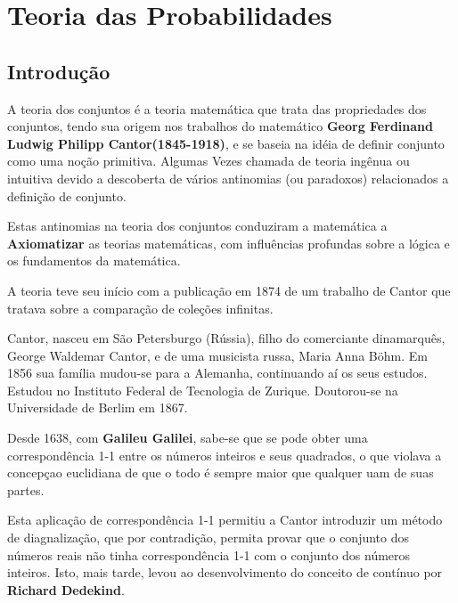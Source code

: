 \chapter{Teoria das Probabilidades}
\section{Introdução}

\inic A teoria dos conjuntos é a teoria matemática que trata das propriedades dos conjuntos, tendo sua origem nos trabalhos do matemático \textbf{Georg Ferdinand Ludwig Philipp Cantor(1845-1918)}, e se baseia na idéia de definir conjunto como uma noção primitiva. Algumas Vezes chamada de teoria ingênua ou intuitiva devido a descoberta de vários antinomias (ou paradoxos) relacionados a definição de conjunto.\vskip0.3cm

\inic Estas antinomias na teoria dos conjuntos conduziram a matemática a \textbf{Axiomatizar} as teorias  matemáticas, com influências profundas sobre a lógica e os fundamentos da matemática.\vskip0.3cm






\inic A teoria teve seu início com a publicação em 1874 de um trabalho de Cantor que tratava sobre a comparação de coleções infinitas.\vskip0.3cm

\inic Cantor, nasceu em São Petersburgo (Rússia), filho do comerciante dinamarquês, George Waldemar Cantor, e de uma musicista russa, Maria Anna Böhm. Em 1856 sua família mudou-se para a Alemanha, continuando aí os seus estudos. Estudou no Instituto Federal de Tecnologia de Zurique. Doutorou-se na Universidade de Berlim em 1867.\vskip0.3cm

\inic Desde 1638, com \textbf{Galileu Galilei}, sabe-se que se pode obter uma correspondência 1-1 entre os números inteiros e seus quadrados, o que violava a concepçao euclidiana de que o todo é sempre maior que qualquer uam de suas partes.\vskip0.3cm

\inic Esta aplicação de correspondência 1-1 permitiu a Cantor introduzir um método de diagnalização, que por contradição, permita provar que o conjunto dos números reais não tinha correspondência 1-1 com o conjunto dos números inteiros. Isto, mais tarde, levou ao desenvolvimento do conceito de contínuo por \textbf{Richard Dedekind}. \vskip0.3cm

